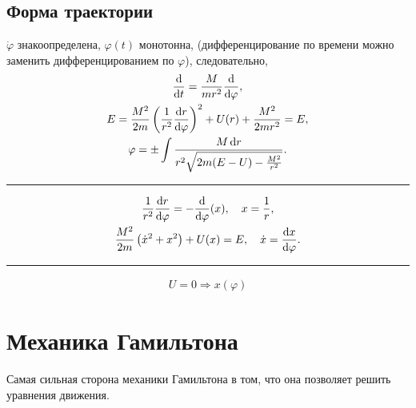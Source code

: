 \documentclass[12pt, a4paper]{article}
\begin{document}
\subsection{Форма траектории}
$\dot{\varphi}$ знакоопределена, $\varphi(t)$ монотонна, (дифференцирование по времени можно заменить дифференцированием по $\varphi$), следовательно, 
\begin{gather}
\dv{t} = \frac{M}{mr^2} \dv{\varphi},\\
E = \frac{M^2}{2m} \left(\frac{1}{r^2} \dv{r}{\varphi} \right)^2 + U(r) + \frac{M^2}{2mr^2} = E,\\
\varphi = \pm \int \frac{M \dd{r}}{r^2 \sqrt{2m (E-U) - \frac{M^2}{r^2}}}.
\end{gather}

\noindent\rule{\textwidth}{0.5pt}
\begin{gather}
\frac{1}{r^2} \dv{r}{\varphi} = - \dv{\varphi} (x), \quad x = \frac{1}{r},\\
\frac{M^2}{2m} \left(\dot{x}^2 + x^2 \right) + U(x) = E, \quad \dot{x} = \dv{x}{\varphi}.
\end{gather}
\noindent\rule{\textwidth}{0.5pt}

\begin{ex}
\begin{gather}
U = 0 \Rightarrow x(\varphi)
\end{gather}

\end{ex}


\newpage
\section{Механика Гамильтона}
Самая сильная сторона механики Гамильтона в том, что она позволяет решить уравнения движения. 
\end{document}
